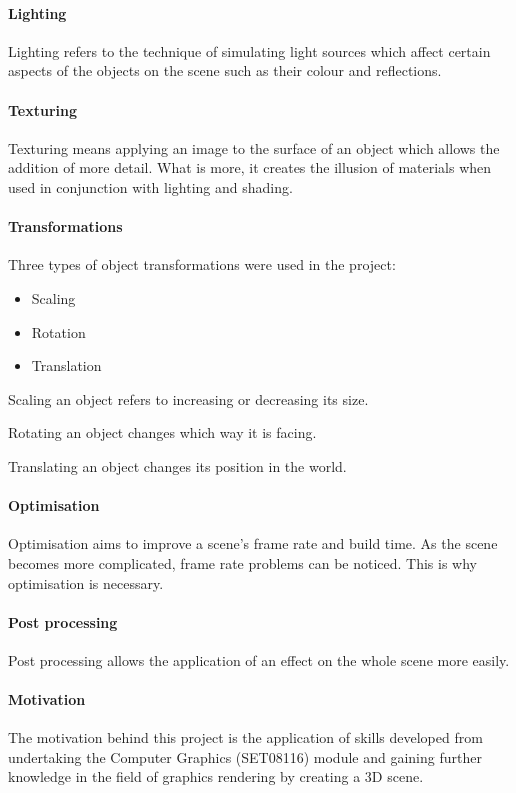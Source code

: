 \documentclass[10pt, a4paper]{article}
\begin{document}
    \paragraph{Lighting}
    Lighting refers to the technique of simulating light sources which affect certain aspects of the objects on the scene such as their colour and reflections.

    \paragraph{Texturing}
    Texturing means applying an image to the surface of an object which allows the addition of more detail. What is more, it creates the illusion of materials when used in conjunction with lighting and shading.

    \paragraph{Transformations}
    Three types of object transformations were used in the project:
    \begin{itemize}
        \item Scaling
        \item Rotation
        \item Translation
    \end{itemize}
    Scaling an object refers to increasing or decreasing its size.

    Rotating an object changes which way it is facing.

    Translating an object changes its position in the world.

    \paragraph{Optimisation} Optimisation aims to improve a scene's frame rate and build time. As the scene becomes more complicated, frame rate problems can be noticed. This is why optimisation is necessary.

    \paragraph{Post processing} Post processing allows the application of an effect on the whole scene more easily.


    \paragraph{Motivation}
    The motivation behind this project is the application of skills developed from undertaking the Computer Graphics (SET08116) module and gaining further knowledge in the field of graphics rendering by creating a 3D scene.
\end{document}

